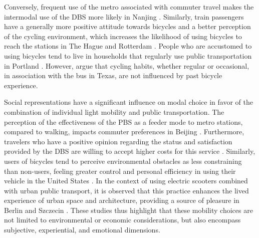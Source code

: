 \begin{refsegment}
Conversely, frequent use of the metro associated with commuter travel makes the intermodal use of the \acrshort{DBS} more likely in Nanjing \textcolor{blue}{\autocite[13]{liu_use_2020}}. Similarly, train passengers have a generally more positive attitude towards bicycles and a better perception of the cycling environment, which increases the likelihood of using bicycles to reach the stations in The Hague and Rotterdam \textcolor{blue}{\autocite[497]{la_paix_puello_role_2021}}. People who are accustomed to using bicycles tend to live in households that regularly use public transportation in Portland \textcolor{blue}{\autocite[101]{singleton_exploring_2014}}. However, \textcolor{blue}{\textcite[94]{taylor_analysis_1996}} argue that cycling habits, whether regular or occasional, in association with the bus in Texas, are not influenced by past bicycle experience.%

Social representations have a significant influence on modal choice in favor of the combination of individual light mobility and public transportation. The perception of the effectiveness of the \acrshort{PBS} as a feeder mode to metro stations, compared to walking, impacts commuter preferences in Beijing \textcolor{blue}{\autocite[7]{zhao_public_2022}}. Furthermore, travelers who have a positive opinion regarding the status and satisfaction provided by the \acrshort{DBS} are willing to accept higher costs for this service \textcolor{blue}{\autocite[10]{guo_exploring_2023}}. Similarly, users of bicycles tend to perceive environmental obstacles as less constraining than non-users, feeling greater control and personal efficiency in using their vehicle in the United States \textcolor{blue}{\autocite[4267]{bopp_examining_2015}}. In the context of using electric scooters combined with urban public transport, it is observed that this practice enhances the lived experience of urban space and architecture, providing a source of pleasure in Berlin and Szczecin \textcolor{blue}{\autocite[7]{kostrzewska_towards_2017}}. These studies thus highlight that these mobility choices are not limited to environmental or economic considerations, but also encompass subjective, experiential, and emotional dimensions.%


\end{refsegment}
